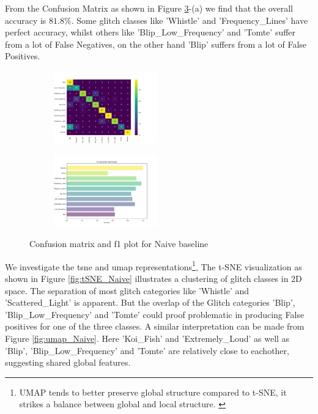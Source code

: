 From the Confusion Matrix as shown in Figure \ref{fig:cm_f1_naive_baseline}-(a) we find that the overall accuracy is $81.8 \%$. Some glitch classes like 'Whistle' and 'Frequency\_Lines' have perfect accuracy, whilst others like 'Blip\_Low\_Frequency' and 'Tomte' suffer from a lot of False Negatives, on the other hand 'Blip' suffers from a lot of False Positives. 

\begin{figure}[ht]
\centering
\begin{subfigure}
  \centering
  \includegraphics[width=0.49\textwidth]{Grad Assignment/Images/cm_MultiView_Naive_100epochs.png}  
  \label{fig:sub-first1}
\end{subfigure}
\begin{subfigure}
  \centering
  \includegraphics[width=0.49\textwidth]{Grad Assignment/Images/f1_MultiView_Naive_100epochs.png}  
  \label{fig:sub-second1}
\end{subfigure}
\caption{Confusion matrix and f1 plot for Naive baseline}
\label{fig:cm_f1_naive_baseline}
\end{figure}

We investigate the \acrshort{tsne} and \acrshort{umap} representations\footnote{UMAP tends to better preserve global structure compared to t-SNE, it strikes a balance between global and local structure. \citep{mcinnes2018umap}}, 
The t-SNE visualization as shown in Figure \ref{fig:tSNE_Naive} illustrates a clustering of glitch classes in 2D space. The separation of most glitch categories like 'Whistle' and 'Scattered\_Light' is apparent. But the overlap of the Glitch categories 'Blip', 'Blip\_Low\_Frequency' and 'Tomte' could proof problematic in producing False positives for one of the three classes.
A similar interpretation can be made from Figure \ref{fig:umap_Naive}. Here 'Koi\_Fish' and 'Extremely\_Loud' as well as 'Blip', 'Blip\_Low\_Frequency' and 'Tomte' are relatively close to eachother, suggesting shared global features. 

